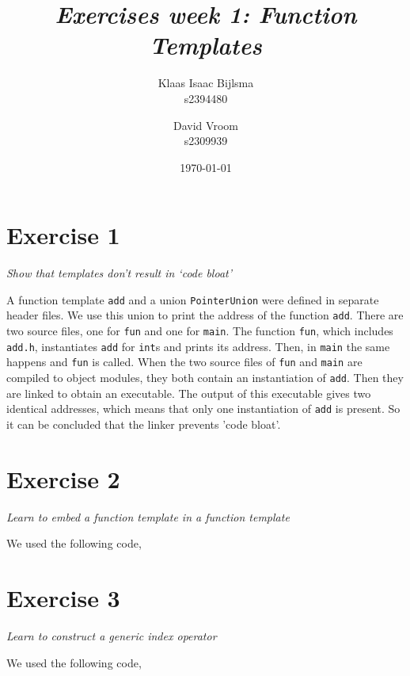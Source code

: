 \documentclass[12pt]{article}
\title{\itshape Exercises week 1: Function Templates}
\author{
	Klaas Isaac Bijlsma \\ s2394480
	\and
	David Vroom \\ s2309939
}
\date{\today}
\newcommand{\desc}[1]{\textit{#1} \vspace{1em}}
\begin{document}
\maketitle

\section*{Exercise 1}
\desc{Show that templates don't result in `code bloat'}

A function template \texttt{add} and a union \texttt{PointerUnion} were defined in separate header files. We use this union to print the address of the function \texttt{add}. There are two source files, one for \texttt{fun} and one for \texttt{main}. The function \texttt{fun}, which includes \texttt{add.h}, instantiates \texttt{add} for \texttt{int}s and prints its address. Then, in \texttt{main} the same happens and \texttt{fun} is called. When the two source files of \texttt{fun} and \texttt{main} are compiled to object modules, they both contain an instantiation of \texttt{add}. Then they are linked to obtain an executable. The output of this executable gives two identical addresses, which means that only one instantiation of \texttt{add} is present. So it can be concluded that the linker prevents 'code bloat'.







\clearpage


\section*{Exercise 2}
\desc{Learn to embed a function template in a function template}

We used the following code,




\clearpage


\section*{Exercise 3}
\desc{Learn to construct a generic index operator}

We used the following code,


\end{document}
